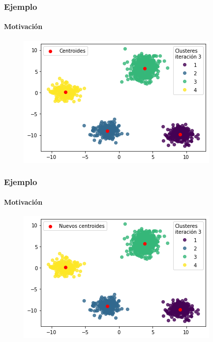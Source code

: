 \documentclass[
  shownotes,
  xcolor={svgnames},
  hyperref={colorlinks,citecolor=DarkBlue,linkcolor=DarkRed,urlcolor=DarkBlue}
  , aspectratio=169]{beamer}
\begin{document}
\begin{frame}
\frametitle{Ejemplo}
\framesubtitle{Motivación}


\begin{figure}[H] \centering

    \centering
    \includegraphics[scale=.7]{figures/output_17_4.png}
  \\
  \tiny
\end{figure}

\end{frame}
\begin{frame}
\frametitle{Ejemplo}
\framesubtitle{Motivación}


\begin{figure}[H] \centering

    \centering
    \includegraphics[scale=.7]{figures/output_17_5.png}
  \\
  \tiny
\end{figure}



\end{frame}
\end{document}
